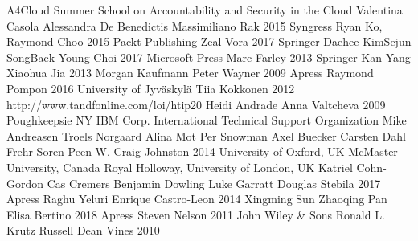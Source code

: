 \documentclass{article}
\begin{document}
\begin{thebibliography}{9}
        A4Cloud Summer School on Accountability and Security in the Cloud
        Valentina Casola
        Alessandra De Benedictis
        Massimiliano Rak
        2015
        Syngress
        Ryan Ko, Raymond Choo
        2015
        Packt Publishing
        Zeal Vora
        2017
        Springer
        Daehee KimSejun
        SongBaek-Young Choi
        2017
        Microsoft Press
        Marc Farley
        2013
        Springer
        Kan Yang
        Xiaohua Jia
        2013
        Morgan Kaufmann
        Peter Wayner
        2009
        Apress
        Raymond Pompon
        2016
        University of Jyväskylä
        Tiia Kokkonen
        2012
        http://www.tandfonline.com/loi/htip20
        Heidi Andrade
        Anna Valtcheva
        2009
        Poughkeepsie NY IBM Corp. International Technical Support Organization
        Mike Andreasen
        Troels Norgaard
        Alina Mot
        Per Snowman
        Axel Buecker
        Carsten Dahl Frehr
        Soren Peen
        W. Craig Johnston
        2014
        University of Oxford, UK
        McMaster University, Canada
        Royal Holloway, University of London, UK
        Katriel Cohn-Gordon
        Cas Cremers
        Benjamin Dowling
        Luke Garratt
        Douglas Stebila
        2017
        Apress
        Raghu Yeluri
        Enrique Castro-Leon
        2014
        Xingming Sun
        Zhaoqing Pan
        Elisa Bertino
        2018
        Apress
        Steven Nelson
        2011
        John Wiley \& Sons
        Ronald L. Krutz
        Russell Dean Vines
        2010

\end{thebibliography}
\end{document}
